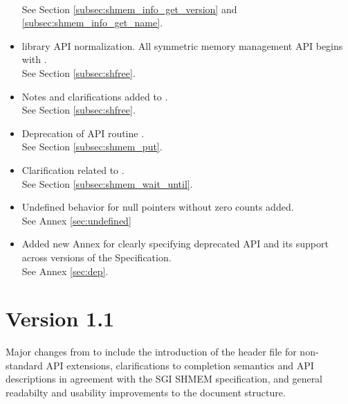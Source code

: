 \begin{itemize}
\\See Section \ref{subsec:shmem_info_get_version} and \ref{subsec:shmem_info_get_name}.
%
\item \openshmem library API normalization. All \Cstd symmetric memory management
      API begins with  .
\\See Section \ref{subsec:shfree}.
%
\item Notes and clarifications added to .
\\See Section \ref{subsec:shfree}.
%
\item Deprecation of \Fortran API routine .
\\See Section \ref{subsec:shmem_put}.
%
\item Clarification related to .
\\See Section \ref{subsec:shmem_wait_until}.
%
\item Undefined behavior for null pointers without zero counts added.
\\See Annex \ref{sec:undefined}
%
\item Added new Annex for clearly specifying deprecated API and its
      support across versions of the \openshmem Specification.
\\See Annex \ref{sec:dep}.
%
\end{itemize}




\section{Version 1.1}
Major changes from \openshmem[1.0] to \openshmem[1.1] include
the introduction of the  header file for non-standard API
extensions,
clarifications to completion semantics and API descriptions in agreement with
the \ac{SGI} SHMEM specification,
and general readabilty and usability improvements to the document structure.

